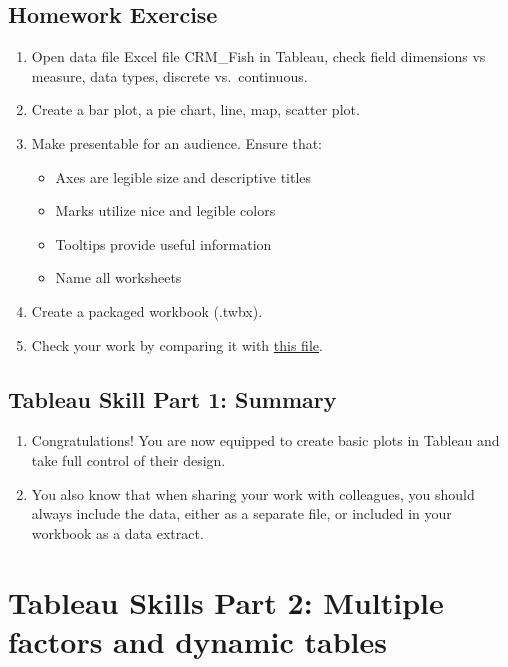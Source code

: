 \documentclass[
]{book}
\providecommand{\tightlist}{%
  \setlength{\itemsep}{0pt}\setlength{\parskip}{0pt}}
\begin{document}
\hypertarget{homework-exercise}{%
\subsection{Homework Exercise}\label{homework-exercise}}

\begin{enumerate}
\def\labelenumi{\arabic{enumi}.}
\tightlist
\item
  Open data file Excel file CRM\_Fish in Tableau, check field dimensions vs measure, data types, discrete vs.~continuous.
\item
  Create a bar plot, a pie chart, line, map, scatter plot.
\item
  Make presentable for an audience. Ensure that:

  \begin{itemize}
  \tightlist
  \item
    Axes are legible size and descriptive titles
  \item
    Marks utilize nice and legible colors
  \item
    Tooltips provide useful information
  \item
    Name all worksheets
  \end{itemize}
\item
  Create a packaged workbook (.twbx).
\item
  Check your work by comparing it with \href{files/M3S2_exercise_key.twbx}{this file}.
\end{enumerate}

\hypertarget{tableau-skill-part-1-summary}{%
\subsection{Tableau Skill Part 1: Summary}\label{tableau-skill-part-1-summary}}

\begin{enumerate}
\def\labelenumi{\arabic{enumi}.}
\tightlist
\item
  Congratulations! You are now equipped to create basic plots in Tableau and take full control of their design.
\item
  You also know that when sharing your work with colleagues, you should always include the data, either as a separate file, or included in your workbook as a data extract.
\end{enumerate}

\hypertarget{tableau-skills-part-2-multiple-factors-and-dynamic-tables}{%
\section{Tableau Skills Part 2: Multiple factors and dynamic tables}\label{tableau-skills-part-2-multiple-factors-and-dynamic-tables}}
\end{document}
